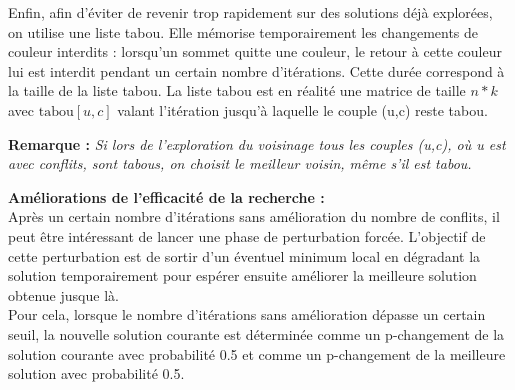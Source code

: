 \documentclass{article}
\begin{document}
Enfin, afin d'éviter de revenir trop rapidement sur des solutions déjà explorées, on utilise une liste tabou. Elle mémorise temporairement les changements de couleur interdits : lorsqu'un sommet quitte une couleur, le retour à cette couleur lui est interdit pendant un certain nombre d'itérations. Cette durée correspond à la taille de la liste tabou.
La liste tabou est en réalité une matrice de taille $n*k$ avec $\text{tabou}[u,c]$ valant l'itération jusqu'à laquelle le couple (u,c) reste tabou.

\textbf{Remarque : }\textit{Si lors de l'exploration du voisinage tous les couples (u,c), où u est avec conflits, sont tabous, on choisit le meilleur voisin, même s'il est tabou.}

\textbf{Améliorations de l'efficacité de la recherche : }\\
Après un certain nombre d'itérations sans amélioration du nombre de conflits, il peut être intéressant de lancer une phase de perturbation forcée. L'objectif de cette perturbation est de sortir d'un éventuel minimum local en dégradant la solution temporairement pour espérer ensuite améliorer la meilleure solution obtenue jusque là.\\
Pour cela, lorsque le nombre d'itérations sans amélioration dépasse un certain seuil, la nouvelle solution courante est déterminée comme un p-changement de la solution courante avec probabilité 0.5 et comme un p-changement de la meilleure solution avec probabilité 0.5. 
\end{document}
